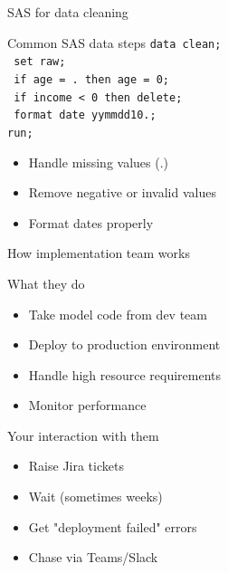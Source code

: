 \documentclass[aspectratio=169, 11pt]{beamer}
\begin{document}
	\begin{frame}{SAS for data cleaning}
		\tiny
		\begin{block}{Common SAS data steps}
			\scriptsize
			\texttt{data clean;}\\
			\texttt{   set raw;}\\
			\texttt{   if age = . then age = 0;}\\
			\texttt{   if income < 0 then delete;}\\
			\texttt{   format date yymmdd10.;}\\
			\texttt{run;}
		\end{block}
		\vspace{0.05cm}
		\begin{itemize}
			\item Handle missing values (.)
			\item Remove negative or invalid values
			\item Format dates properly
		\end{itemize}
	\end{frame}
	
	\begin{frame}{How implementation team works}
		\tiny
		\begin{block}{What they do}
			\begin{itemize}
				\item Take model code from dev team
				\item Deploy to production environment
				\item Handle high resource requirements
				\item Monitor performance
			\end{itemize}
		\end{block}
		\begin{block}{Your interaction with them}
			\tiny
			\begin{itemize}
				\item Raise Jira tickets
				\item Wait (sometimes weeks)
				\item Get "deployment failed" errors
				\item Chase via Teams/Slack
			\end{itemize}
		\end{block}
	\end{frame}
	
\end{document}
